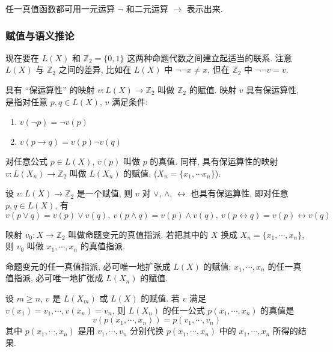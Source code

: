 \documentclass[
    color=black,
    device=normal,
    lang=cn
]{elegantnote}
\begin{document}
\begin{proposition}
    任一真值函数都可用一元运算 $\lnot$ 和二元运算 $\to$ 表示出来.
\end{proposition}

\subsubsection{赋值与语义推论}
现在要在 $L(X)$ 和 $\mathbb{Z}_2=\{0,1\}$ 这两种命题代数之间建立起适当的联系. 注意 $L(X)$ 与 $\mathbb{Z}_2$ 之间的差异, 比如在 $L(X)$ 中 $\lnot \lnot x \neq x$, 但在 $\mathbb{Z}_2$ 中 $\lnot \lnot v = v$.

\begin{definition}[赋值]
    具有 ``保运算性'' 的映射 $v:L(X)\to\mathbb{Z}_2$ 叫做 $\mathbb{Z}_2$ 的赋值. 映射 $v$ 具有保运算性, 是指对任意 $p,q\in L(X)$, $v$ 满足条件:
    \begin{enumerate}[(1), topsep = -1em]
        \item $v(\lnot p)=\lnot v(p)$
        \item $v(p\to q)= v(p)\lnot v(q)$
    \end{enumerate}
    对任意公式 $p\in L(X)$, $v(p)$ 叫做 $p$ 的真值. 同样, 具有保运算性的映射 $v:L(X_n)\to \mathbb{Z}_2$ 叫做 $L(X_n)$ 的赋值. ($X_n=\{x_1,\cdots x_n\}$).
\end{definition}
\begin{proposition}
    设 $v:L(X)\to\mathbb{Z}_2$ 是一个赋值, 则 $v$ 对 $\lor$, $\land$, $\leftrightarrow$ 也具有保运算性, 即对任意 $p,q\in L(X)$, 有
    $$
        v(p\lor q)=v(p)\lor v(q),\ v(p\land q)=v(p)\land v(q),\ v(p\leftrightarrow q)=v(p)\leftrightarrow v(q)
    $$
\end{proposition}
\begin{definition}[真值指派]
    映射 $v_0: X\to\mathbb{Z}_2$ 叫做命题变元的真值指派. 若把其中的 $X$ 换成 $X_n=\{x_1, \cdots, x_n\}$, 则 $v_0$ 叫做 $x_1, \cdots, x_n$ 的真值指派.
\end{definition}
\begin{theorem}
    命题变元的任一真值指派, 必可唯一地扩张成 $L(X)$ 的赋值; $x_1, \cdots, x_n$ 的任一真值指派, 必可唯一地扩张成 $L(X_n)$ 的赋值.
\end{theorem}
\begin{proposition}
    设 $m\geq n$, $v$ 是 $L(X_m)$ 或 $L(X)$ 的赋值. 若 $v$ 满足 $v(x_1)=v_1, \cdots, v(x_n)=v_n$, 则 $L(X_n)$ 的任一公式 $p(x_1, \cdots, x_n)$ 的真值是
    $$
        v(p(x_1, \cdots, x_n))=p(v_1, \cdots, v_n)
    $$
    其中 $p(x_1,\cdots,x_n)$ 是用 $v_1, \cdots, v_n$ 分别代换 $p(x_1, \cdots, x_n)$ 中的 $x_1, \cdots, x_n$ 所得的结果.
\end{proposition}
\end{document}
